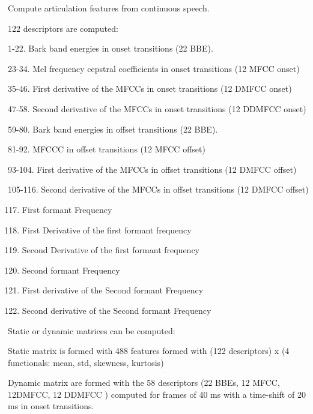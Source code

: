 \documentclass[letterpaper,10pt,english]{sphinxmanual}
\begin{document}
\begin{fulllineitems}
\label{\detokenize{Articulation:articulation.Articulation}}
Compute articulation features from continuous speech.

122 descriptors are computed:

1-22. Bark band energies in onset transitions (22 BBE).

23-34. Mel frequency cepstral coefficients in onset transitions (12 MFCC onset)

35-46. First derivative of the MFCCs in onset transitions (12 DMFCC onset)

47-58. Second derivative of the MFCCs in onset transitions (12 DDMFCC onset)

59-80. Bark band energies in offset transitions (22 BBE).

81-92. MFCCC in offset transitions (12 MFCC offset)

93-104. First derivative of the MFCCs in offset transitions (12 DMFCC offset)

105-116. Second derivative of the MFCCs in offset transitions (12 DMFCC offset)
\begin{enumerate}
\setcounter{enumi}{116}
\item {} 
First formant Frequency

\item {} 
First Derivative of the first formant frequency

\item {} 
Second Derivative of the first formant frequency

\item {} 
Second formant Frequency

\item {} 
First derivative of the Second formant Frequency

\item {} 
Second derivative of the Second formant Frequency

\end{enumerate}

Static or dynamic matrices can be computed:

Static matrix is formed with 488 features formed with (122 descriptors) x (4 functionals: mean, std, skewness, kurtosis)

Dynamic matrix are formed with the 58 descriptors (22 BBEs, 12 MFCC, 12DMFCC, 12 DDMFCC ) computed for frames of 40 ms with a time-shift of 20 ms in onset transitions.


\end{fulllineitems}
\end{document}
